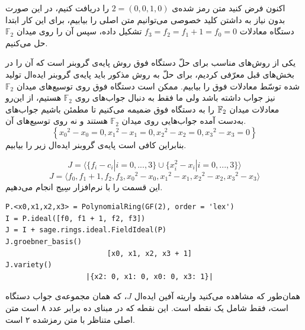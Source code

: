 \begin{example}
	اکنون فرض کنید متن رمز شده‌‌‌ی
	$2 = (0,0,1,0)$
	را دریافت کنیم، در این صورت بدون نیاز به داشتن کلید خصوصی می‌توانیم متن اصلی را بیابیم، برای این کار ابتدا دستگاه معادلات 
{\small $f_{3} = f_{2} = f_{1} + 1 = f_{0} = 0$}
	تشکیل داده، سپس  آن را روی میدان
	$\mathbb{F}_{2}$
	حل می‌کنیم.
	
	یکی از روش‌های مناسب برای حلّ دستگاه فوق روش پایه‌ی گروبنر است که آن را در بخش‌های قبل معرّفی کردیم، برای حلّ به روش مذکور باید پایه‌ی گروبنر ایده‌ال تولید شده توسّط معادلات فوق را بیابیم. ممکن است دستگاه فوق روی توسیع‌های میدان 
	$\mathbb{F}_{2}$
	نیز جواب داشته باشد ولی ما فقط به دنبال جواب‌های روی
	$\mathbb{F}_{2}$
	هستیم،
	از این‌رو معادلات میدان 
	$\mathbb{F}_{2}$
	را به دستگاه فوق ضمیمه می‌کنیم تا مطمئن باشیم جواب‌های به‌دست آمده جواب‌هایی روی میدان 
	$\mathbb{F}_{2}$
	هستند و نه روی توسیع‌های آن.
	$$\left\{ {x_{{0}}}^{2}-x_{{0}} = 0 , {x_{{1}}}^{2}-x_{{1}} =0,{x_{{2}}}^{2}-x_{{2}} = 0,{x_{{3}}}^{2}-x_{{3}} = 0\right\} $$
	بنابراین کافی است پایه‌ی گروبنر ایده‌ال زیر را بیابیم.
	
	$$J =\langle \{ f_{i} - c_{i} | i = 0,...,3\}\cup \{x_{i}^{2}-x_{i} | i = 0,...,3\}\rangle$$
	$$J = \langle f_{0},f_{1}+1,f_2,f_3,{x_{{0}}}^{2}-x_{{0}},  {x_{{1}}}^{2}-x_{{1}},{x_{{2}}}^{2}-x_{{2}},{x_{{3}}}^{2}-x_{{3}}
	\rangle $$ 	 	
	این قسمت را با نرم‌افزار سِیج انجام می‌دهیم.
\begin{latin}
\begin{flushleft}
\begin{lstlisting}
P.<x0,x1,x2,x3> = PolynomialRing(GF(2), order = 'lex')
I = P.ideal([f0, f1 + 1, f2, f3])
J = I + sage.rings.ideal.FieldIdeal(P)
J.groebner_basis()
                        [x0, x1, x2, x3 + 1]
J.variety()
                   |{x2: 0, x1: 0, x0: 0, x3: 1}|
\end{lstlisting}
\end{flushleft}
\end{latin}	
\end{example}
همان‌طور که مشاهده می‌کنید واریته آفین ایده‌ال 
$J$، 
که همان مجموعه‌ی جواب دستگاه است، فقط شامل یک نقطه است. این نقطه که در مبنای ده برابر عدد ۸ است متن اصلی متناظر با متن‌ رمز‌شده‌ ۲ است. 

